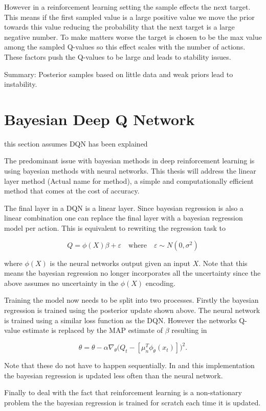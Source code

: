 However in a reinforcement learning setting the sample effects the next target. This means if the first sampled value is a large positive value we move the prior towards this value reducing the probability that the next target is a large negative number. To make matters worse the target is chosen to be the max value among the sampled Q-values so this effect scales with the number of actions. These factors push the Q-values to be large and leads to stability issues.

Summary: Posterior samples based on little data and weak priors lead to instability.

\section{Bayesian Deep Q Network}

\todo this section assumes DQN has been explained

The predominant issue with bayesian methods in deep reinforcement learning is using bayesian methods with neural networks. This thesis will address the linear layer method (\todo Actual name for method), a simple and computationally efficient method that comes at the cost of accuracy. 

The final layer in a DQN is a linear layer. Since bayesian regression is also a linear combination one can replace the final layer with a bayesian regression model per action. This is equivalent to rewriting the regression task to 

\begin{equation*}
	Q = \phi(X)\beta + \varepsilon \quad \text{where} \quad \varepsilon \sim N(0,\sigma^2)
\end{equation*}

where $\phi(X)$ is the neural networks output given an input $X$. Note that this means the bayesian regression no longer incorporates all the uncertainty since the above assumes no uncertainty in the $\phi(X)$ encoding. 

Training the model now needs to be split into two processes. Firstly the bayesian regression is trained using the posterior update shown above. The neural network is trained using a similar loss function as the DQN. However the networks Q-value estimate is replaced by the MAP estimate of $\beta$ resulting in

\begin{equation*}
	\theta = \theta - \alpha\nabla_\theta\big(Q_t - [\mu_n^T\phi_\theta(x_t)]\big)^2.
\end{equation*}

Note that these do not have to happen sequentially. In \cite{azziz_2018} and this implementation the bayesian regression is updated less often than the neural network.

Finally to deal with the fact that reinforcement learning is a non-stationary problem the the bayesian regression is trained for scratch each time it is updated.

\cleardoublepage
